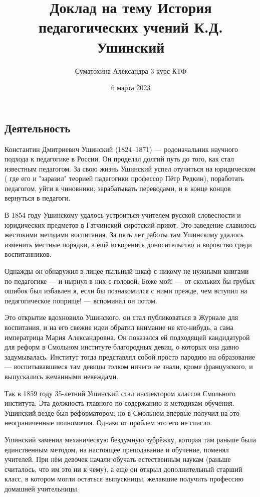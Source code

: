 
\usepackage{csquotes}

\title{Доклад на тему История педагогических учений К.Д. Ушинский}
\author{Суматохина Александра 3 курс КТФ}
\date{6 марта 2023}

\maketitle

\subsection*  {Деятельность}
Константин Дмитриевич Ушинский (1824–1871) — родоначальник научного подхода к педагогике в России. Он проделал долгий путь до того, как стал известным педагогом. За свою жизнь Ушинский успел отучиться на юридическом ( где его и "заразил" теорией падагогики профессор Пётр Редкин), поработать педагогом, уйти в чиновники, зарабатывать переводами, и в конце концов вернуться в педагоги.

В 1854 году Ушинскому удалось устроиться учителем русской словесности и юридических предметов в Гатчинский сиротский приют. Это заведение славилось жестокими методами воспитания. За пять лет работы там Ушинскому удалось изменить местные порядки, а ещё искоренить доносительство и воровство среди воспитанников.

Однажды он обнаружил в лицее пыльный шкаф с никому не нужными книгами по педагогике — и нырнул в них с головой. Боже мой! — от скольких бы грубых ошибок был избавлен я, если бы познакомился с ними прежде, чем вступил на педагогическое поприще! — вспоминал он потом.

Это открытие вдохновило Ушинского, он стал публиковаться в Журнале для воспитания, и на его свежие идеи обратил внимание не кто-нибудь, а сама императрица Мария Александровна. Он показался ей подходящей кандидатурой для реформ в Смольном институте благородных девиц, о которых она давно задумывалась. Институт тогда представлял собой просто пародию на образование — воспитывавшиеся там девицы толком ничего не знали, кроме французского, и выпускались жеманными невеждами.

Так в 1859 году 35-летний Ушинский стал инспектором классов Смольного института. Эта должность главного по содержанию и методикам обучения. Ушинский везде был реформатором, но в Смольном впервые получил на это неограниченные полномочия. Однако от проблем это его не спасло.

Ушинский  заменил механическую бездумную зубрёжку, которая там раньше была единственным методом, на настоящее преподавание и обучение, поменял учителей. 
При нём девочек начали обучать естественным наукам (раньше считалось, что им это ни к чему), а ещё он открыл дополнительный старший класс, в котором могли остаться выпускницы, желавшие получить профессию домашней учительницы.

